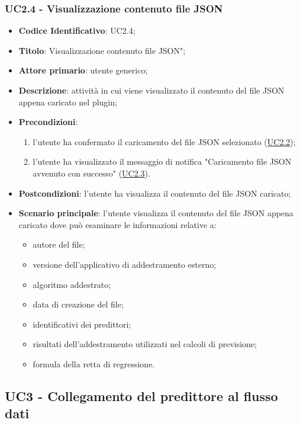 	\subsubsection{UC2.4 - Visualizzazione contenuto file JSON}
		\begin{itemize}
			\item\textbf{Codice Identificativo}: UC2.4;
			\item\textbf{Titolo}: Visualizzazione contenuto file JSON";
			\item\textbf{Attore primario}: utente generico;
			\item\textbf{Descrizione}: attività in cui viene visualizzato il contenuto del file JSON appena caricato nel plugin;
			\item\textbf{Precondizioni}: 
				\begin{enumerate}
					\item l'utente ha confermato il caricamento del file JSON selezionato (\hyperref[par:UC2.2]{UC2.2});
					\item l'utente ha visualizzato il messaggio di notifica "Caricamento file JSON avvenuto con successo" (\hyperref[par:UC2.3]{UC2.3}).
				\end{enumerate}
			\item\textbf{Postcondizioni}: l'utente ha visualizza il contenuto del file JSON caricato;
			\item\textbf{Scenario principale}: l'utente visualizza il contenuto del file JSON appena caricato dove può esaminare le informazioni relative a:
			\begin{itemize}
			\item autore del file;
			\item versione dell'applicativo di addestramento esterno;
			\item algoritmo addestrato;
			\item data di creazione del file;
			\item identificativi dei predittori;
			\item risultati dell'addestramento utilizzati nel calcoli di previsione;
			\item formula della retta di regressione.
\end{itemize}			
			
		\end{itemize}


	\label{par:UC3}
	\subsection{UC3 - Collegamento del predittore al flusso dati}
	
